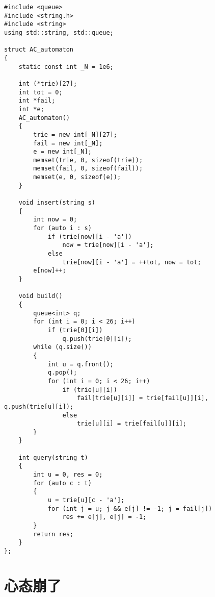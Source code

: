 \documentclass[]{article}
\begin{document}
\begin{verbatim}
#include <queue>
#include <string.h>
#include <string>
using std::string, std::queue;

struct AC_automaton
{
    static const int _N = 1e6;

    int (*trie)[27];
    int tot = 0;
    int *fail;
    int *e;
    AC_automaton()
    {
        trie = new int[_N][27];
        fail = new int[_N];
        e = new int[_N];
        memset(trie, 0, sizeof(trie));
        memset(fail, 0, sizeof(fail));
        memset(e, 0, sizeof(e));
    }

    void insert(string s)
    {
        int now = 0;
        for (auto i : s)
            if (trie[now][i - 'a'])
                now = trie[now][i - 'a'];
            else
                trie[now][i - 'a'] = ++tot, now = tot;
        e[now]++;
    }

    void build()
    {
        queue<int> q;
        for (int i = 0; i < 26; i++)
            if (trie[0][i])
                q.push(trie[0][i]);
        while (q.size())
        {
            int u = q.front();
            q.pop();
            for (int i = 0; i < 26; i++)
                if (trie[u][i])
                    fail[trie[u][i]] = trie[fail[u]][i], q.push(trie[u][i]);
                else
                    trie[u][i] = trie[fail[u]][i];
        }
    }

    int query(string t)
    {
        int u = 0, res = 0;
        for (auto c : t)
        {
            u = trie[u][c - 'a'];
            for (int j = u; j && e[j] != -1; j = fail[j])
                res += e[j], e[j] = -1;
        }
        return res;
    }
};

\end{verbatim}

\hypertarget{ux5fc3ux6001ux5d29ux4e86}{%
\section{心态崩了}\label{ux5fc3ux6001ux5d29ux4e86}}
\end{document}
